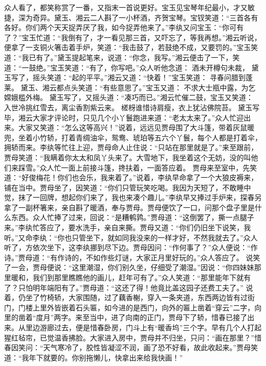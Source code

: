 \documentclass[12pt,oneside]{book}
\begin{document}
众人看了，都笑称赏了一番，又指末一首说更好。宝玉见宝琴年纪最小，才又敏捷，深为奇异。黛玉、湘云二人斟了一小杯酒，齐贺宝琴。宝钗笑道：“三首各有各好。你们两个天天捉弄厌了我，如今捉弄他来了。”李纨又问宝玉：“你可有了？”宝玉忙道：“我倒有了，才一看见那三首，又吓忘了，等我再想。”湘云听说，便拿了一支铜火箸击着手炉，笑道：“我击鼓了，若鼓绝不成，又要罚的。”宝玉笑道：“我已有了。”黛玉提起笔来，说道：“你念，我写。”湘云便击了一下，笑道：“一鼓绝。”宝玉笑道：“有了，你写吧。”众人听他念道：
酒未开樽句未裁，
黛玉写了，摇头笑道：“起的平平。”湘云又道：“快着！”宝玉笑道：
寻春问腊到蓬莱。
黛玉、湘云都点头笑道：“有些意思了。”宝玉又道：
不求大士瓶中露，为乞嫦娥槛外梅。
黛玉写了，又摇头道：“凑巧而已。”湘云忙催二鼓，宝玉又笑道：
入世冷挑红雪去，离尘香割紫云来。
槎枒谁惜诗肩瘦，衣上犹沾佛院苔。
黛玉写毕，湘云大家才评论时，只见几个小丫鬟跑进来道：“老太太来了。”众人忙迎出来。大家又笑道：“怎么这等高兴！”说着，远远见贾母围了大斗篷，带着灰鼠暖兜，坐着小竹轿，打着青绸油伞，鸳鸯、琥珀等五六个丫鬟，每个人都是打着伞，拥轿而来。李纨等忙往上迎，贾母命人止住说：“只站在那里就是了。”来至跟前，贾母笑道：“我瞒着你太太和凤丫头来了。大雪地下，我坐着这个无妨，没的叫他们来踩雪。”众人忙一面上前接斗篷，搀扶着，一面答应着。
贾母来至室中，先笑道：“好俊梅花！你们也会乐，我来着了。”说着，李纨早命拿了一个大狼皮褥来，铺在当中。贾母坐了，因笑道：“你们只管玩笑吃喝。我因为天短了，不敢睡中觉，抹了一回牌，想起你们来了，我也来凑个趣儿。”李纨早又捧过手炉来，探春另拿了一副杯箸来，亲自斟了暖酒，奉与贾母。贾母便饮了一口，问那个盘子里是什么东西。众人忙捧了过来，回说：“是糟鹌鹑。”贾母道：“这倒罢了，撕一点腿子来。”李纨忙答应了，要水洗手，亲自来撕。贾母又道：“你们仍旧坐下说笑，我听。”又命李纨：“你也只管坐下，就如同我没来的一样才好，不然我就去了。”众人听了，方依次坐下，这李纨挪到尽下边。贾母因问：“作何事了？”众人便说：“作诗。”贾母道：“有作诗的，不如作些灯谜，大家正月里好玩的。”众人答应了。
说笑了一会，贾母便说：“这里潮湿，你们别久坐，仔细受了潮湿。”因说：“你四妹妹那里暖和，我们到那里瞧瞧他的画儿，赶年可有了。”众人笑道：“那里能年下就有了？只怕明年端阳有了。”贾母道：“这还了得！他竟比盖这园子还费工夫了。”
说着，仍坐了竹椅轿，大家围随，过了藕香榭，穿入一条夹道，东西两边皆有过街门，门楼上里外皆嵌着石头匾，如今进的是西门，向外的匾上凿着“穿云”二字，向里的凿着“度月”两字。来至当中，进了向南的正门，贾母下了轿，惜春已接了出来。从里边游廊过去，便是惜春卧房，门斗上有“暖香坞”三个字。早有几个人打起猩红毡帘，已觉温香拂脸。大家进入房中，贾母并不归坐，只问：“画在那里？”惜春因笑问：“天气寒冷了，胶性皆凝涩不润，画了恐不好看，故此收起来。”贾母笑道：“我年下就要的。你别拖懒儿，快拿出来给我快画！”
\end{document}
